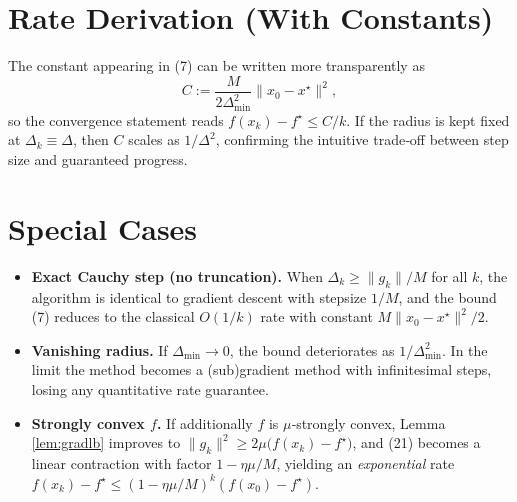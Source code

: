 \documentclass{article}
\begin{document}
\section*{Rate Derivation (With Constants)}
The constant appearing in (7) can be written more transparently as
\[
C:=\frac{M}{2\Delta_{\min}^{2}}\|x_{0}-x^\star\|^{2},
\]
so the convergence statement reads $f(x_{k})-f^\star\le C/k$.
If the radius is kept fixed at $\Delta_k\equiv\Delta$, then $C$ scales as
$1/\Delta^{2}$, confirming the intuitive trade‑off between step size and
guaranteed progress.

\section*{Special Cases}
\begin{itemize}
\item \textbf{Exact Cauchy step (no truncation).}
When $\Delta_k\ge\|g_k\|/M$ for all $k$, the algorithm is identical to
gradient descent with stepsize $1/M$, and the bound (7) reduces to the
classical $O(1/k)$ rate with constant $M\|x_0-x^\star\|^{2}/2$.
\item \textbf{Vanishing radius.}
If $\Delta_{\min}\to0$, the bound deteriorates as $1/\Delta_{\min}^{2}$.
In the limit the method becomes a (sub)gradient method with
infinitesimal steps, losing any quantitative rate guarantee.
\item \textbf{Strongly convex $f$.}
If additionally $f$ is $\mu$‑strongly convex, Lemma \ref{lem:gradlb}
improves to $\|g_k\|^{2}\ge 2\mu\bigl(f(x_k)-f^\star\bigr)$, and (21) becomes
a linear contraction with factor $1-\eta\mu/M$, yielding an
\emph{exponential} rate $f(x_k)-f^\star\le(1-\eta\mu/M)^{k}(f(x_0)-f^\star)$.
\end{itemize}
\end{document}
